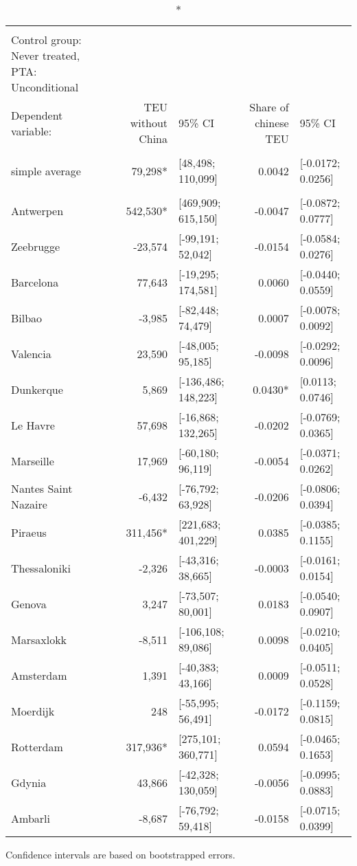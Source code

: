 \setlength{\LTpost}{0mm}
\begin{longtable}{l|rlrl}
\caption*{
{\large Aggregated average treatment effects on container throughput from different origins} \\ 
{\small Control group: Never treated, PTA: Unconditional}
} \\ 
\toprule
\multicolumn{1}{l}{Dependent variable:} & TEU without China & 95\% CI & Share of chinese TEU & 95\% CI \\ 
\midrule\addlinespace[2.5pt]
\multicolumn{5}{l}{\vspace*{-5mm}} \\ 
\midrule\addlinespace[2.5pt]
simple average &  79,298* & [48,498; 110,099] &  0.0042 & [-0.0172; 0.0256] \\ 
\midrule\addlinespace[2.5pt]
\multicolumn{5}{l}{by group:} \\ 
\midrule\addlinespace[2.5pt]
Antwerpen & 542,530* & [469,909; 615,150] & -0.0047 & [-0.0872; 0.0777] \\ 
Zeebrugge & -23,574 & [-99,191; 52,042] & -0.0154 & [-0.0584; 0.0276] \\ 
Barcelona &  77,643 & [-19,295; 174,581] &  0.0060 & [-0.0440; 0.0559] \\ 
Bilbao &  -3,985 & [-82,448; 74,479] &  0.0007 & [-0.0078; 0.0092] \\ 
Valencia &  23,590 & [-48,005; 95,185] & -0.0098 & [-0.0292; 0.0096] \\ 
Dunkerque &   5,869 & [-136,486; 148,223] &  0.0430* & [0.0113; 0.0746] \\ 
Le Havre &  57,698 & [-16,868; 132,265] & -0.0202 & [-0.0769; 0.0365] \\ 
Marseille &  17,969 & [-60,180; 96,119] & -0.0054 & [-0.0371; 0.0262] \\ 
Nantes Saint Nazaire &  -6,432 & [-76,792; 63,928] & -0.0206 & [-0.0806; 0.0394] \\ 
Piraeus & 311,456* & [221,683; 401,229] &  0.0385 & [-0.0385; 0.1155] \\ 
Thessaloniki &  -2,326 & [-43,316; 38,665] & -0.0003 & [-0.0161; 0.0154] \\ 
Genova &   3,247 & [-73,507; 80,001] &  0.0183 & [-0.0540; 0.0907] \\ 
Marsaxlokk &  -8,511 & [-106,108; 89,086] &  0.0098 & [-0.0210; 0.0405] \\ 
Amsterdam &   1,391 & [-40,383; 43,166] &  0.0009 & [-0.0511; 0.0528] \\ 
Moerdijk &     248 & [-55,995; 56,491] & -0.0172 & [-0.1159; 0.0815] \\ 
Rotterdam & 317,936* & [275,101; 360,771] &  0.0594 & [-0.0465; 0.1653] \\ 
Gdynia &  43,866 & [-42,328; 130,059] & -0.0056 & [-0.0995; 0.0883] \\ 
Ambarli &  -8,687 & [-76,792; 59,418] & -0.0158 & [-0.0715; 0.0399] \\ 
\bottomrule
\end{longtable}
\begin{minipage}{\linewidth}
Confidence intervals are based on bootstrapped errors.\\
\end{minipage}

